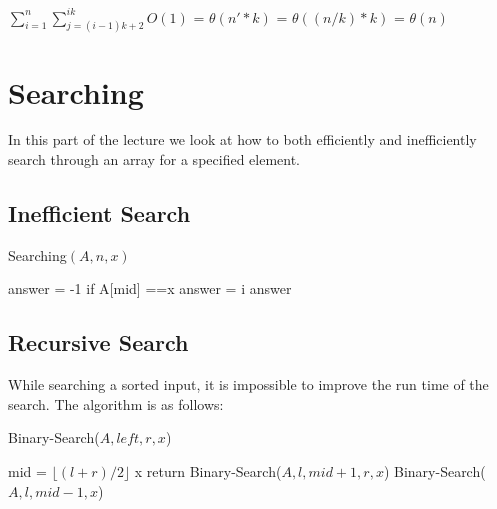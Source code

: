\documentclass[11pt]{article}
\begin{document}
$\sum_{i=1}^{n} \sum_{j=(i-1)k+2}^{ik}O(1)$ = 
$\theta(n'*k)$ = 
$\theta((n/k) * k)$ = $\theta(n)$	

\section{Searching}
In this part of the lecture we look at how to both efficiently and inefficiently search through an array for a specified element.

\subsection{Inefficient Search}
\begin{algorithm}
\caption{Searching$(A, n, x)$}
\begin{algorithmic}
\STATE answer = -1
\STATE if A[mid] ==x
	\STATE answer = i 
\ENDFOR
\RETURN answer
\end{algorithmic}
\end{algorithm}

\subsection{Recursive Search}
While searching a sorted input, it is impossible to improve the run time of the search. The algorithm is as follows:

\begin{algorithm}
\caption{Binary-Search($A, left, r, x$)}
\begin{algorithmic} 
\STATE mid = $\lfloor (l + r)/2 \rfloor$
\ENDIF
{}
	\RETURN x
\ENDIF
{}
	\RETURN return Binary-Search($A, l, mid+1, r, x$)
\ELSE
	\RETURN Binary-Search($A, l, mid-1, x$)
\ENDIF
\end{algorithmic}
\end{algorithm}
\end{document}
